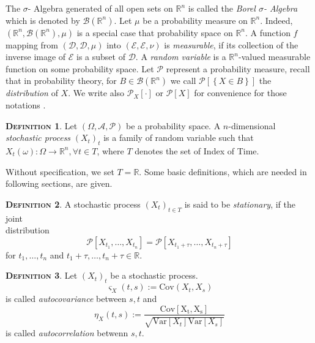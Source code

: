 \documentclass[a4paper, twoside, 11pt]{article}
\theoremstyle{definition}
\newtheorem{definition}{\scshape Definition}[section]
\def\bsigma{\mathscr{B}\brkt{\mathbb{R}^{n}}}
\newcommand{\sqbr}[1]{\left[ {#1} \right]}
\newcommand{\brkt}[1]{\left({#1} \right)}
\begin{document}
The $\sigma$- Algebra generated of all open sets on $\mathbb{R}^{n}$ is called the \emph{Borel $\sigma$- Algebra} which is denoted by $\mathscr{B}\left(\mathbb{R}^{n}\right)$. Let $\mu$ be a probability measure on $\mathbb{R}^{n}$. Indeed, $\brkt{\mathbb{R}^{n}, \mathscr{B}\brkt{\mathbb{R}^{n}}, \mu}$ is a special case that probability space on $\mathbb{R}^{n}$. A function $f$ mapping from $\brkt{\mathcal{D}, \mathscr{D}, \mu}$ into $\brkt{\mathcal{E}, \mathscr{E}, \nu}$ is \emph{measurable}, if its collection of the inverse image of $\mathscr{E}$ is a subset of $\mathscr{D}$. A \emph{random variable} is a $\mathbb{R}^{n}$-valued measurable function on some probability space. Let $\mathcal{P}$ represent a probability measure, recall that in probability theory, for $B \in \bsigma$ we call $\mathcal{P}\sqbr{\left\{X \in B\right\}}$ the \emph{distribution} of $X$. We write also $\mathcal{P}_X \sqbr{\cdot}$ or $\mathcal{P}\sqbr{X}$ for convenience for those notations .

\begin{definition}
  Let $\brkt{\Omega, \mathscr{A}, \mathcal{P}}$ be a probability space. A $n$-dimensional \emph{stochastic process} $\brkt{X_t}_{t}$ is a family of random variable such that $X_t\brkt{\omega} : \Omega \longrightarrow  \mathbb{R}^{n},  \forall t \in T$, where $T$ denotes the set of Index of Time.    
\end{definition}

Without specification, we set $T=\mathbb{R}$. Some basic definitions, which are needed in following sections, are given.
\begin{definition}
  A stochastic process $\brkt{X_t}_{t \in T}$ is said to be \emph{stationary}, if the joint \\distribution 
\[
  \mathcal{P}\sqbr{X_{t_1},\dots,X_{t_n}} = \mathcal{P}\sqbr{X_{t_1+\tau},\dots,X_{t_n+\tau}} 
\]
for $t_1, \dots, t_n$ and $t_1+\tau,\dots,t_n+\tau \in \mathbb{R}$. 
\label{sec:stn}
\end{definition}
\begin{definition}
  Let $(X_t)_t$ be a stochastic process. 
  \begin{equation*}
	\varsigma_X(t,s) := \mathrm{Cov}(X_t, X_s) 
  \end{equation*} is called \emph{autocovariance} between $s, t$ and 
  \begin{equation*}
	\eta_X(t, s) := \frac{\mathrm{Cov[X_t, X_s]}}{\sqrt{\mathrm{Var}[X_t]\mathrm{Var}[X_s]}}
  \end{equation*}
  is called \emph{autocorrelation} betwenn $s, t$.
\end{definition}
\end{document}
